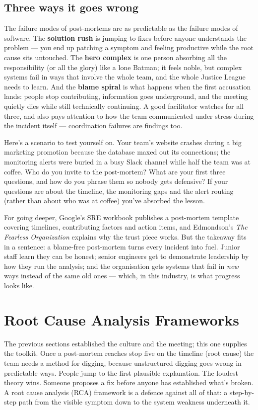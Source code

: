 \subsection{Three ways it goes wrong}


The failure modes of post-mortems are as predictable as the failure modes of software. The \textbf{solution rush} is jumping to fixes before anyone understands the problem — you end up patching a symptom and feeling productive while the root cause sits untouched. The \textbf{hero complex} is one person absorbing all the responsibility (or all the glory) like a lone Batman; it feels noble, but complex systems fail in ways that involve the whole team, and the whole Justice League needs to learn. And the \textbf{blame spiral} is what happens when the first accusation lands: people stop contributing, information goes underground, and the meeting quietly dies while still technically continuing. A good facilitator watches for all three, and also pays attention to how the team communicated under stress during the incident itself — coordination failures are findings too.


Here's a scenario to test yourself on. Your team's website crashes during a big marketing promotion because the database maxed out its connections; the monitoring alerts were buried in a busy Slack channel while half the team was at coffee. Who do you invite to the post-mortem? What are your first three questions, and how do you phrase them so nobody gets defensive? If your questions are about the timeline, the monitoring gaps and the alert routing (rather than about who was at coffee) you've absorbed the lesson.


For going deeper, Google's SRE workbook publishes a post-mortem template covering timelines, contributing factors and action items, and Edmondson's \emph{The Fearless Organization} explains why the trust piece works. But the takeaway fits in a sentence: a blame-free post-mortem turns every incident into fuel. Junior staff learn they can be honest; senior engineers get to demonstrate leadership by how they run the analysis; and the organisation gets systems that fail in \emph{new} ways instead of the same old ones — which, in this industry, is what progress looks like.

\section{Root Cause Analysis Frameworks}
The previous sections established the culture and the meeting; this one supplies the toolkit. Once a post-mortem reaches stop five on the timeline (root cause) the team needs a method for digging, because unstructured digging goes wrong in predictable ways. People jump to the first plausible explanation. The loudest theory wins. Someone proposes a fix before anyone has established what's broken. A root cause analysis (RCA) framework is a defence against all of that: a step-by-step path from the visible symptom down to the system weakness underneath it.



